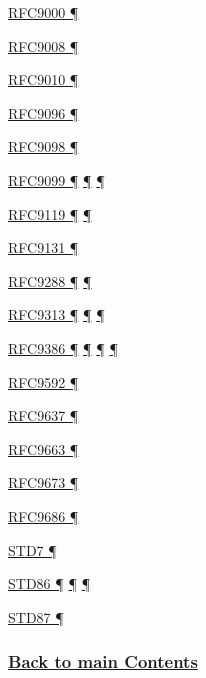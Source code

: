 \documentclass[
]{article}
\begin{document}
\hyperref[transport-protocols]{RFC9000 ¶}

\hyperref[routing]{RFC9008 ¶}

\hyperref[routing]{RFC9010 ¶}

\hyperref[routing]{RFC9096 ¶}

\hyperref[extension-headers-and-options]{RFC9098 ¶}

\hyperref[security]{RFC9099 ¶}
\hyperref[address-and-prefix-management]{¶}
\hyperref[security-operation]{¶}

\hyperref[address-resolution]{RFC9119 ¶} \hyperref[layer-2-functions]{¶}

\hyperref[address-resolution]{RFC9131 ¶}

\hyperref[extension-headers-and-options]{RFC9288 ¶}
\hyperref[filtering]{¶}

\hyperref[coexistence-with-legacy-ipv4]{RFC9313 ¶}
\hyperref[dual-stack-scenarios]{¶}
\hyperref[translation-and-ipv4-as-a-service]{¶}

\hyperref[dual-stack-scenarios]{RFC9386 ¶}
\hyperref[deployment-by-carriers]{¶}
\hyperref[deployment-in-the-enterprise]{¶} \hyperref[status]{¶}

\hyperref[addresses]{RFC9592 ¶}

\hyperref[addresses]{RFC9637 ¶}

\hyperref[prefix-per-host]{RFC9663 ¶}

\hyperref[extension-headers-and-options]{RFC9673 ¶}

\hyperref[address-and-prefix-management]{RFC9686 ¶}

\hyperref[transport-protocols]{STD7 ¶}

\hyperref[ipv6-basic-technology]{STD86 ¶}
\hyperref[extension-headers-and-options]{¶} \hyperref[markdown-usage]{¶}

\hyperref[extension-headers-and-options]{STD87 ¶}

\subsubsection{\texorpdfstring{\hyperref[list-of-contents]{Back to main
Contents}}{Back to main Contents}}\label{back-to-main-contents-13}

\pagebreak
\end{document}
